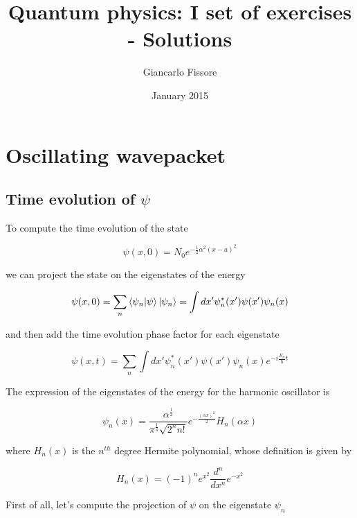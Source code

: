 \documentclass{article}
\begin{document}
\title{Quantum physics: I set of exercises - Solutions}
\author{Giancarlo Fissore}
\date{January 2015}
\maketitle

\section{Oscillating wavepacket}

\subsection{Time evolution of \(\psi\)}
To compute the time evolution of the state

\begin{equation}
\psi(x,0) = N_0 e^{-\frac{1}{2} \alpha^2 (x-a)^2}
\end{equation}

we can project the state on the eigenstates of the energy

\begin{equation}
\psi(x,0) = \sum_{n} \braket{\psi_n}{\psi} \ket{\psi_n} = \int dx' \psi_n^*(x') \psi(x') \psi_n(x)
\end{equation}

and then add the time evolution phase factor for each eigenstate

\begin{equation}
\psi(x,t) = \sum_{n} \int dx' \psi_n^*(x') \psi(x') \psi_n(x) e^{-i \frac{E_n}{\hbar} t}
\end{equation}

The expression of the eigenstates of the energy for the harmonic oscillator is

\begin{equation}
\psi_n(x) = \frac{\alpha^{\frac{1}{2}}}{\pi^{\frac{1}{4}} \sqrt{2^n n!}} e^{-\frac{(\alpha x)^2}{2}} H_n(\alpha x)
\end{equation}

where \( H_n(x) \) is the \(n^{th}\) degree Hermite polynomial, whose definition is given by

\begin{equation}
H_n(x) = (-1)^n e^{x^2} \frac{d^n}{dx^n} e^{-x^2}
\end{equation}

First of all, let's compute the projection of \( \psi \) on the eigenstate \( \psi_n \)
\end{document}
